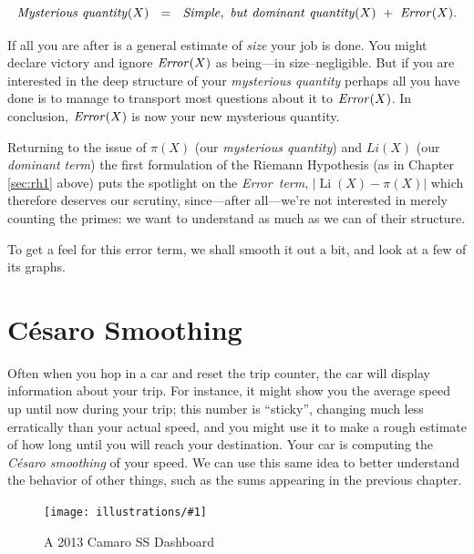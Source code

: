 \documentclass[openany]{book}
\DeclareMathOperator{\Li}{Li}
\newcommand{\ill}[3]{%
   \begin{figure}[H]%
   \vspace{-2ex}
   \centering%
   \texttt{[image: illustrations/\#1]}%
   \caption{#3}%
   \vspace{-2ex}
    \end{figure}}
\theoremstyle{plain}
\theoremstyle{definition}
\begin{document}
 $${\it Mysterious\  quantity}(X)\ \ = \ \ {\it Simple, \ but \ dominant\ quantity}(X) \ + \ {\it Error}(X).$$

 If all you are after is a general estimate of {\it size}  your job is done. You might declare victory and ignore ${\it Error}(X)$ as being---in size--negligible. But if you are interested in the deep structure of your {\it mysterious quantity} perhaps all you have done is to manage to transport most questions about it to  ${\it Error}(X)$. In conclusion, ${\it Error}(X)$ is now your new mysterious quantity.

 Returning to the issue of $\pi(X)$ (our {\it mysterious quantity}) and $Li(X)$ (our {\it dominant term}) the first formulation of the Riemann Hypothesis  (as in Chapter \ref{sec:rh1} above)  puts the spotlight on the {\it Error\ term}, $|\Li(X) - \pi(X)|$ which therefore deserves our scrutiny, since---after all---we're not interested in merely counting the primes: we want to understand as much as we can of their structure.

   To get a feel for this error term, we shall smooth it out a bit, and look at a few of its graphs.


\chapter {C{\'e}saro Smoothing}\label{ces}

Often when you hop in a car and reset the trip counter, the car
will display information about your trip.  For instance, it might show you the
average speed up until now during your trip; this number
is ``sticky'', changing much less erratically than your
actual speed, and you might use it to make a rough estimate of
how long until you will reach your destination.
Your car is computing the {\em C{\'e}saro smoothing }of your speed.
We can use this same idea to better understand the behavior
of other things, such as the sums appearing in
the previous chapter.
\ill{camaro}{.7}{A 2013 Camaro SS Dashboard}
\end{document}
